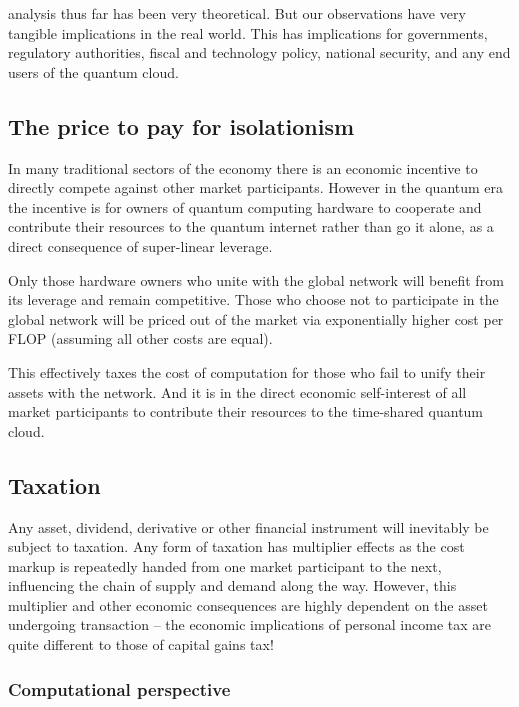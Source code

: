  analysis thus far has been very theoretical. But our observations have very tangible implications in the real world. This has implications for governments, regulatory authorities, fiscal and technology policy, national security, and any end users of the quantum cloud.

%
%

\subsection{The price to pay for isolationism}

In many traditional sectors of the economy there is an economic incentive to directly compete against other market participants. However in the quantum era the incentive is for owners of quantum computing hardware to cooperate and contribute their resources to the quantum internet rather than go it alone, as a direct consequence of super-linear leverage.

Only those hardware owners who unite with the global network will benefit from its leverage and remain competitive. Those who choose not to participate in the global network will be priced out of the market via exponentially higher cost per FLOP (assuming all other costs are equal).

This effectively taxes the cost of computation for those who fail to unify their assets with the network. And it is in the direct economic self-interest of all market participants to contribute their resources to the time-shared quantum cloud.

%
%

\subsection{Taxation}\label{sec:taxation}

Any asset, dividend, derivative or other financial instrument will inevitably be subject to taxation. Any form of taxation has multiplier effects as the cost markup is repeatedly handed from one market participant to the next, influencing the chain of supply and demand along the way. However, this multiplier and other economic consequences are highly dependent on the asset undergoing transaction -- the economic implications of personal income tax are quite different to those of capital gains tax!

\subsubsection{Computational perspective}

